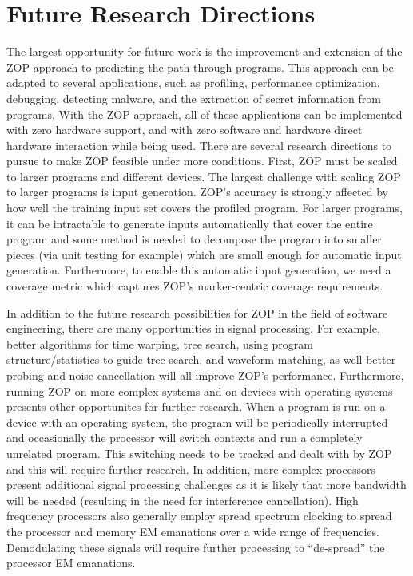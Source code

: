 \section{Future Research Directions}
The largest opportunity for future work is the improvement and extension of the ZOP approach to predicting the path through programs. This approach can be adapted to several applications, such as profiling, performance optimization, debugging, detecting malware, and the extraction of secret information from programs. With the ZOP approach, all of these applications can be implemented with zero hardware support, and with zero software and hardware direct hardware interaction while being used. There are several research directions to pursue to make ZOP feasible under more conditions. First, ZOP must be scaled to larger programs and different devices. The largest challenge with scaling ZOP to larger programs is input generation. ZOP's accuracy is strongly affected by how well the training input set covers the profiled program. For larger programs, it can be intractable to generate inputs automatically that cover the entire program and some method is needed to decompose the program into smaller pieces (via unit testing for example) which are small enough for automatic input generation. Furthermore, to enable this automatic input generation, we need a coverage metric which captures ZOP's marker-centric coverage requirements.

In addition to the future research possibilities for ZOP in the field of software engineering, there are many opportunities in signal processing. For example, better algorithms for time warping, tree search, using program structure/statistics to guide tree search, and waveform matching, as well better probing and noise cancellation will all improve ZOP's performance. Furthermore, running ZOP on more complex systems and on devices with operating systems presents other opportunites for further research. When a program is run on a device with an operating system, the program will be periodically interrupted and occasionally the processor will switch contexts and run a completely unrelated program. This switching needs to be tracked and dealt with by ZOP and this will require further research. In addition, more complex processors present additional signal processing challenges as it is likely that more bandwidth will be needed (resulting in the need for interference cancellation). High frequency processors also generally employ spread spectrum clocking to spread the processor and memory EM emanations over a wide range of frequencies. Demodulating these signals will require further processing to ``de-spread'' the processor EM emanations. 


